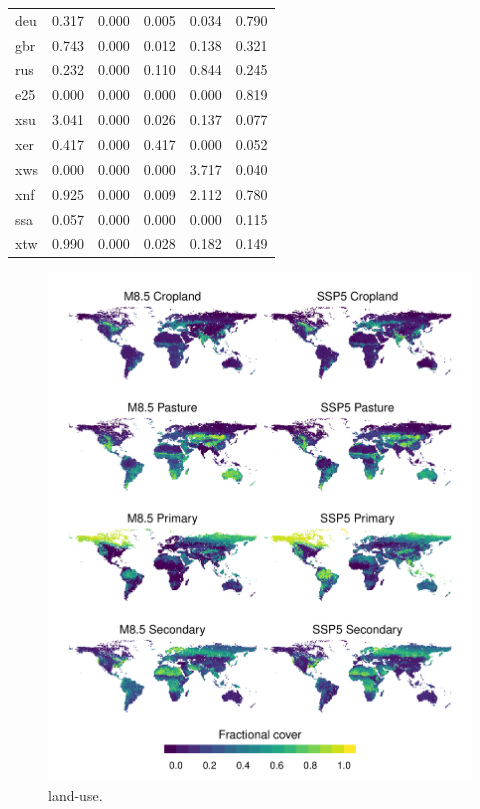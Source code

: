 \begin{table}[htb]
\begin{tabularx}{0.55\textwidth}{lllllY}
deu    & 0.317    & 0.000   & 0.005   & 0.034     & 0.790 \\
gbr    & 0.743    & 0.000   & 0.012   & 0.138     & 0.321 \\
rus    & 0.232    & 0.000   & 0.110   & 0.844     & 0.245 \\
e25    & 0.000    & 0.000   & 0.000   & 0.000     & 0.819 \\
xsu    & 3.041    & 0.000   & 0.026   & 0.137     & 0.077 \\
xer    & 0.417    & 0.000   & 0.417   & 0.000     & 0.052 \\
xws    & 0.000    & 0.000   & 0.000   & 3.717     & 0.040 \\
xnf    & 0.925    & 0.000   & 0.009   & 2.112     & 0.780 \\
ssa    & 0.057    & 0.000   & 0.000   & 0.000     & 0.115 \\
xtw    & 0.990    & 0.000   & 0.028   & 0.182     & 0.149 \\
\bottomrule
\end{tabularx}
\end{table}

    
\begin{figure}[htb]
  \centering
    \includegraphics{chapters/figures/chapter4/fig_landusemaps.pdf}
    \caption{land-use.}
    \label{ch4:fig_landusemaps}
\end{figure}
    
